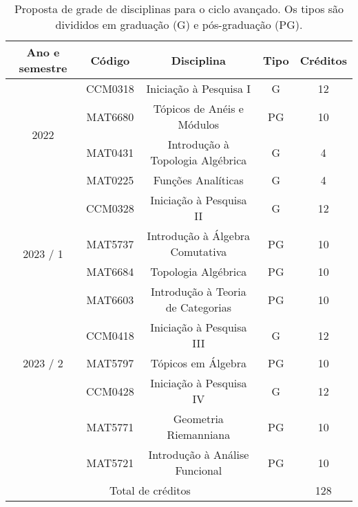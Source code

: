 \documentclass[11pt,reqno]{amsart}
\theoremstyle{definition}
\begin{document}
\begin{table}[h!]\label{tab:disc}
  \centering
  \caption{Proposta de grade de disciplinas para o ciclo avançado. Os tipos são
    divididos em graduação (G) e pós-graduação (PG).}
  \begin{tabular}{ |c|c|c|c|c| }
    \hline
    Ano e semestre & Código & Disciplina & Tipo & Créditos \\
    \hline

    \multirow{4}{*}{2022} & CCM0318 & Iniciação à Pesquisa I & G & 12 \\
                   & MAT6680 &Tópicos de Anéis e Módulos & PG & 10 \\
                   & MAT0431 & Introdução à Topologia Algébrica & G & 4 \\
                   & MAT0225 & Funções Analíticas & G & 4 \\
    \hline

    \multirow{4}{*}{2023 / 1} & CCM0328 & Iniciação à Pesquisa II & G & 12 \\
                   & MAT5737  & Introdução à Álgebra Comutativa & PG & 10 \\
                   & MAT6684 & Topologia Algébrica & PG & 10 \\
                   & MAT6603 & Introdução à Teoria de Categorias & PG & 10 \\
    \hline

    \multirow{3}{*}{2023 / 2} & CCM0418 & Iniciação à Pesquisa III & G & 12 \\
                   & MAT5797  & Tópicos em Álgebra & PG & 10 \\
    \hline

    \multirow{3}{*}{2024} & CCM0428 & Iniciação à Pesquisa IV & G & 12 \\
                   & MAT5771 & Geometria Riemanniana & PG & 10 \\
                   & MAT5721 & Introdução à Análise Funcional & PG & 10 \\
    \hline

    \multicolumn{4}{|c|}{Total de créditos} & 128 \\
    \hline
\end{tabular}
\end{table}
\end{document}
